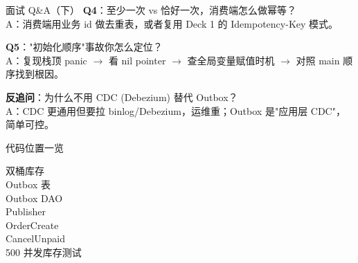\begin{frame}{面试 Q\&A（下）}
\textbf{Q4}：至少一次 vs 恰好一次，消费端怎么做幂等？\\
\hspace{4mm}\small A：消费端用业务 id 做去重表，或者复用 Deck 1 的 Idempotency-Key 模式。

\vspace{2mm}
\textbf{Q5}："初始化顺序"事故你怎么定位？\\
\hspace{4mm}\small A：复现栈顶 panic $\to$ 看 nil pointer $\to$ 查全局变量赋值时机 $\to$ 对照 main 顺序找到根因。

\vspace{2mm}
\textbf{反追问}：为什么不用 CDC (Debezium) 替代 Outbox？\\
\hspace{4mm}\small A：CDC 更通用但要拉 binlog/Debezium，运维重；Outbox 是"应用层 CDC"，简单可控。
\end{frame}

\begin{frame}{代码位置一览}
\begin{description}
  \item[双桶库存]
  \item[Outbox 表]
  \item[Outbox DAO]
  \item[Publisher]
  \item[OrderCreate]
  \item[CancelUnpaid]
  \item[500 并发库存测试]
\end{description}
\vspace{1mm}
\end{frame}


